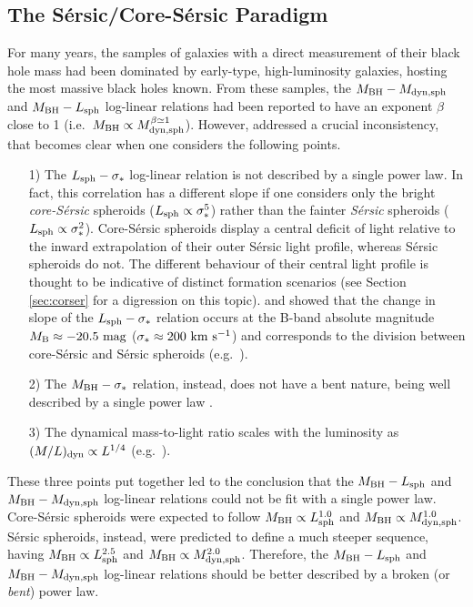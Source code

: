 \subsection{The S\'ersic/Core-S\'ersic Paradigm}  
\label{sec:bent}
For many years, the samples of galaxies with a direct measurement of their black hole mass 
had been dominated by early-type, high-luminosity galaxies, hosting the most massive black holes known. 
From these samples, the $M_{\rm BH} - M_{\rm dyn,sph}$ and $M_{\rm BH} - L_{\rm sph}$ log-linear relations 
had been reported to have an exponent $\beta$ close to 1 (i.e.~$M_{\rm BH} \propto M_{\rm dyn,sph}^{\beta \simeq 1}$). 
However, \cite{graham2012bent} addressed a crucial inconsistency, 
that becomes clear when one considers the following points. 

\begin{itemize} 
\item[1)] The $L_{\rm sph} - \sigma_*$ log-linear relation is not described by a single power law. %
	  In fact, this correlation has a different slope if one considers only the bright \emph{core-S\'ersic} spheroids
	  ($L_{\rm sph} \propto \sigma_*^5$) rather than the fainter \emph{S\'ersic} spheroids ($L_{\rm sph} \propto \sigma_*^2$).
	  Core-S\'ersic spheroids display a central deficit of light relative to the inward extrapolation of their 
	  outer S\'ersic light profile, whereas S\'ersic spheroids do not. 
	  The different behaviour of their central light profile is thought to be indicative of distinct formation scenarios 
	  (see Section \ref{sec:corser} for a digression on this topic).
	  \cite{davies1983} and \cite{matkovicguzman2005} showed that the change in slope of the $L_{\rm sph} - \sigma_*$ relation 
	  occurs at the B-band absolute magnitude $M_{\rm B} \approx -20.5~\rm mag$ ($\sigma_* \approx 200~\rm km~s^{-1}$) and corresponds to 
	  the division between core-S\'ersic and S\'ersic spheroids (e.g.~\citealt{grahamguzman2003}).
\item[2)] The $M_{\rm BH} - \sigma_*$ relation, instead, does not have a bent nature, 
          being well described by a single power law \citep{graham2012bent}.
\item[3)] The dynamical mass-to-light ratio scales with the luminosity as $(M/L)_{\rm dyn} \propto L^{1/4}$ (e.g.~\citealt{faber1987}).
\end{itemize}

These three points put together led to the conclusion that 
the $M_{\rm BH} - L_{\rm sph}$ and $M_{\rm BH} - M_{\rm dyn,sph}$ log-linear
relations could not be fit with a single power law. 
Core-S\'ersic spheroids were expected to follow $M_{\rm BH} \propto L_{\rm sph}^{1.0}$ and 
$M_{\rm BH} \propto M_{\rm dyn,sph}^{1.0}$.
S\'ersic spheroids, instead, were predicted to define a much steeper sequence, having $M_{\rm BH} \propto L_{\rm sph}^{2.5}$ and 
$M_{\rm BH} \propto M_{\rm dyn,sph}^{2.0}$.
Therefore, the $M_{\rm BH} - L_{\rm sph}$ and $M_{\rm BH} - M_{\rm dyn,sph}$ log-linear
relations should be better described by a broken (or \emph{bent}) power law. \\

